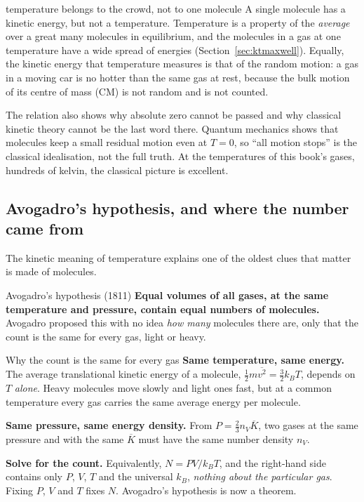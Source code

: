 \begin{trapbox}{temperature belongs to the crowd, not to one molecule}
A single molecule has a kinetic energy, but not a temperature. Temperature is a property of the
\emph{average} over a great many molecules in equilibrium, and the molecules in a gas at one temperature
have a wide spread of energies (Section~\ref{sec:ktmaxwell}). Equally, the kinetic energy that
temperature measures is that of the random motion: a gas in a moving car is no hotter than the same gas
at rest, because the bulk motion of its centre of mass (CM) is not random and is not counted.
\end{trapbox}

The relation also shows why absolute zero cannot be passed and why classical kinetic theory cannot be the
last word there. Quantum mechanics shows that molecules keep a small residual motion even at $T=0$, so
``all motion stops'' is the classical idealisation, not the full truth. At the temperatures of this
book's gases, hundreds of kelvin, the classical picture is excellent.

\subsection{Avogadro's hypothesis, and where the number came from}

The kinetic meaning of temperature explains one of the oldest clues that matter is made of molecules.

\begin{defbox}{Avogadro's hypothesis (1811)}
\textbf{Equal volumes of all gases, at the same temperature and pressure, contain equal numbers of
molecules.} Avogadro proposed this with no idea \emph{how many} molecules there are, only that the
count is the same for every gas, light or heavy.
\end{defbox}

\begin{derivbox}{Why the count is the same for every gas}
 \textbf{Same temperature, same energy.} The average translational kinetic energy of a molecule,
$\tfrac12 m\overline{v^2} = \tfrac32 k_BT$, depends on $T$ \emph{alone}. Heavy molecules move slowly and
light ones fast, but at a common temperature every gas carries the same average energy per molecule.

 \textbf{Same pressure, same energy density.} From $P=\tfrac23 n_V\overline K$, two gases at the
same pressure and with the same $\overline K$ must have the same number density $n_V$.

 \textbf{Solve for the count.} Equivalently, $N = PV/k_BT$, and the right-hand side contains only
$P$, $V$, $T$ and the universal $k_B$, \emph{nothing about the particular gas}. Fixing $P$, $V$ and $T$
fixes $N$. Avogadro's hypothesis is now a theorem.
\end{derivbox}

